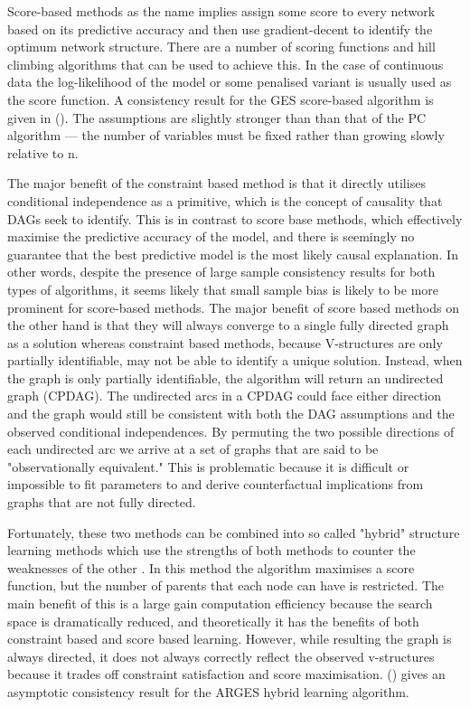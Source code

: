 \documentclass{article}
\begin{document}
Score-based methods as the name implies assign some score to every network based on its predictive accuracy and then use gradient-decent to identify the optimum network structure. There are a number of scoring functions and hill climbing algorithms that can be used to achieve this. In the case of continuous data the log-likelihood of the model or some penalised variant is usually used as the score function. A consistency result for the GES score-based algorithm is given in \citeauthor{chickering2002optimal} (\citeyear{chickering2002optimal}). The assumptions are slightly stronger than than that of the PC algorithm --- the number of variables must be fixed rather than growing slowly relative to n.

The major benefit of the constraint based method is that it directly utilises conditional independence as a primitive, which is the concept of causality that DAGs seek to identify. This is in contrast to score base methods, which effectively maximise the predictive accuracy of the model, and there is seemingly no guarantee that the best predictive model is the most likely causal explanation. In other words, despite the presence of large sample consistency results for both types of algorithms, it seems likely that small sample bias is likely to be more prominent for score-based methods. The major benefit of score based methods on the other hand is that they will always converge to a single fully directed graph as a solution whereas constraint based methods, because V-structures are only partially identifiable, may not be able to identify a unique solution. Instead, when the graph is only partially identifiable, the algorithm will return an undirected graph (CPDAG). The undirected arcs in a CPDAG could face either direction and the graph would still be consistent with both the DAG assumptions and the observed conditional independences. By permuting the two possible directions of each undirected arc we arrive at a set of graphs that are said to be "observationally equivalent." This is problematic because it is difficult or impossible to fit parameters to and derive counterfactual implications from graphs that are not fully directed.  

Fortunately, these two methods can be combined into so called "hybrid" structure learning methods which use the strengths of both methods to counter the weaknesses of the other \parencite{scutari2014multiple} \parencite{friedman2013learning}. In this method the algorithm maximises a score function, but the number of parents that each node can have is restricted. The main benefit of this is a large gain computation efficiency because the search space is dramatically reduced, and theoretically it has the benefits of both constraint based and score based learning. However, while resulting the graph is always directed, it does not always correctly reflect the observed v-structures because it trades off constraint satisfaction and score maximisation. \citeauthor{nandy2018high} (\citeyear{nandy2018high}) gives an asymptotic consistency result for the ARGES hybrid learning algorithm.
\end{document}
